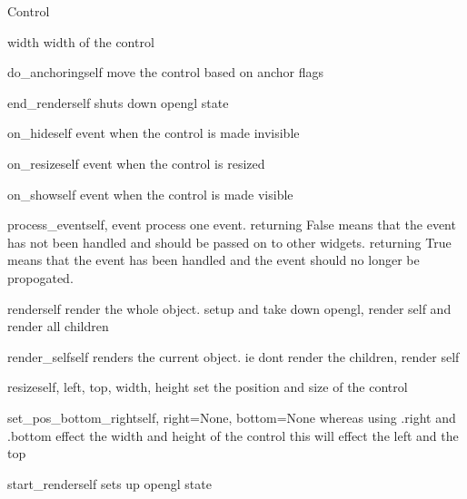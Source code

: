 \begin{classdesc*}{Control}
\begin{memberdesc}{width}
width of the control
\end{memberdesc}

\begin{methoddesc}{do_anchoring}{self}
move the control based on anchor flags
\end{methoddesc}

\begin{methoddesc}{end_render}{self}
shuts down opengl state
\end{methoddesc}

\begin{methoddesc}{on_hide}{self}
event when the control is made invisible
\end{methoddesc}

\begin{methoddesc}{on_resize}{self}
event when the control is resized
\end{methoddesc}

\begin{methoddesc}{on_show}{self}
event when the control is made visible
\end{methoddesc}

\begin{methoddesc}{process_event}{self, event}
process one event. returning False means that the event has not been
handled and should be passed on to other widgets. returning True means
that the event has been handled and the event should no longer be 
propogated.
\end{methoddesc}

\begin{methoddesc}{render}{self}
render the whole object. setup and take down opengl, render self and 
render all children
\end{methoddesc}

\begin{methoddesc}{render_self}{self}
renders the current object. ie dont render the children, render self
\end{methoddesc}

\begin{methoddesc}{resize}{self, left, top, width, height}
set the position and size of the control
\end{methoddesc}

\begin{methoddesc}{set_pos_bottom_right}{self, right=None, bottom=None}
whereas using .right and .bottom effect the width and height of the 
control this will effect the left and the top
\end{methoddesc}

\begin{methoddesc}{start_render}{self}
sets up opengl state
\end{methoddesc}

\end{classdesc*}

